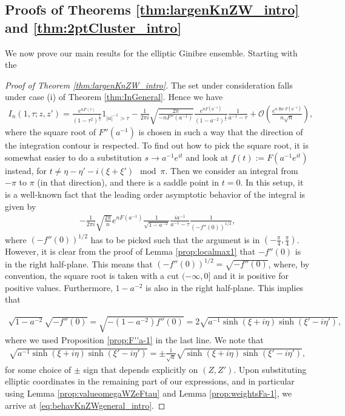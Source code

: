 \documentclass[%
 jmp,
cp,  %
 amsmath,amsthm,amssymb,%
 reprint,%
onecolumn]{revtex4-2}
\begin{document}
\subsection{Proofs of Theorems \ref{thm:largenKnZW_intro} and \ref{thm:2ptCluster_intro}}
We now prove our main results for the elliptic Ginibre ensemble. Starting with the

\begin{proof}[Proof of Theorem \ref{thm:largenKnZW_intro}]
The set under consideration falls under case (i) of Theorem \ref{thm:InGeneral}. Hence we have
\begin{align*}
I_n(1, \tau;z,z')
= \frac{e^{n F(\tau)}}{(1-\tau^2)^\frac{1}{2}} \mathfrak{1}_{|a|^{-1}>\tau} 
- \frac{1}{2\pi i} \sqrt{\frac{2\pi}{-n F''(a^{-1})}} \frac{e^{n F(a^{-1})}}{(1-a^{-2})^\frac{1}{2}} \frac{1}{a^{-1}-\tau}
+ \mathcal O\left(\frac{e^{n \operatorname{Re} F(a^{-1})}}{n\sqrt n}\right),
\end{align*}
where the square root of $F''(a^{-1})$ is chosen in such a way that the direction of the integration contour is respected. To find out how to pick the square root, it is somewhat easier to do a substitution $s\to a^{-1} e^{it}$ and look at $f(t):= F(a^{-1} e^{it})$ instead, for $t\neq \eta-\eta'-i(\xi+\xi') \mod \pi$. Then we consider an integral from $-\pi$ to $\pi$ (in that direction), and there is a saddle point in $t=0$. In this setup, it is a well-known fact that the leading order asymptotic behavior of the integral is given by
\begin{align*}
-\frac{1}{2\pi i} \sqrt{\frac{2\pi}{n}} e^{n F(a^{-1})} \frac{1}{\sqrt{1-a^{-2}}} \frac{i a^{-1}}{a^{-1}-\tau} \frac{1}{(-f''(0))^{1/2}},
\end{align*} 
where $(-f''(0))^{1/2}$ has to be picked such that the argument is in $(-\frac{\pi}{4}, \frac{\pi}{4})$. However, it is clear from the proof of Lemma \ref{prop:localmax1} that $-f''(0)$ is in the right half-plane. This means that $(-f''(0))^{1/2} = \sqrt{-f''(0)}$, where, by convention, the square root is taken with a cut $(-\infty,0]$ and it is positive for positive values. Furthermore, $1-a^{-2}$ is also in the right half-plane. This implies that 

\begin{align*}
\sqrt{1-a^{-2}} \sqrt{-f''(0)} = \sqrt{-(1-a^{-2}) f''(0)} = 2 \sqrt{a^{-1} \sinh(\xi+i\eta) \sinh(\xi'-i\eta')},
\end{align*}
where we used Proposition \ref{prop:F''a-1} in the last line. We note that 
\begin{align} \label{eq:pmSqrtSaddle}\sqrt{a^{-1} \sinh(\xi+i\eta) \sinh(\xi'-i\eta')} = \pm \frac{1}{\sqrt a} \sqrt{\sinh(\xi+i\eta) \sinh(\xi'-i\eta')},
\end{align}
for some choice of $\pm$ sign that depends explicitly on $(Z,Z')$. Upon substituting elliptic coordinates in the remaining part of our expressions, and in particular using Lemma \ref{prop:valueomegaWZeFtau} and Lemma \ref{prop:weightsFa-1}, we arrive at \eqref{eq:behavKnZWgeneral_intro}.
\end{proof}
\end{document}
